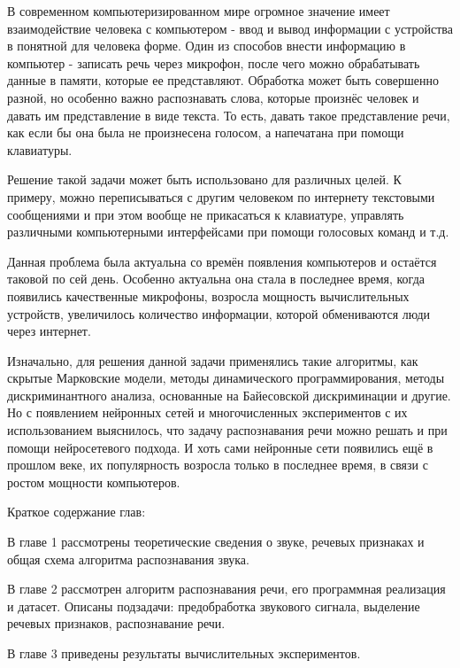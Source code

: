 В современном компьютеризированном мире огромное значение имеет взаимодействие человека с компьютером - ввод и вывод информации с устройства в понятной для человека форме. Один из способов внести информацию в компьютер - записать речь через микрофон, после чего можно обрабатывать данные в памяти, которые ее представляют. Обработка может быть совершенно разной, но особенно важно распознавать слова, которые произнёс человек и давать им представление в виде текста. То есть, давать такое представление речи, как если бы она была не произнесена голосом, а напечатана при помощи клавиатуры. 

Решение такой задачи может быть использовано для различных целей. К примеру, можно переписываться с другим человеком по интернету текстовыми сообщениями и при этом вообще не прикасаться к клавиатуре, управлять различными компьютерными интерфейсами при помощи голосовых команд и т.д.

Данная проблема была актуальна со времён появления компьютеров и остаётся таковой по сей день. Особенно актуальна она стала в последнее время, когда появились качественные микрофоны, возросла мощность вычислительных устройств, увеличилось количество информации, которой обмениваются люди через интернет.

Изначально, для решения данной задачи применялись такие алгоритмы, как скрытые Марковские модели, методы динамического программирования, методы дискриминантного анализа, основанные на Байесовской дискриминации и другие. Но с появлением нейронных сетей и многочисленных экспериментов с их использованием выяснилось, что задачу распознавания речи можно решать и при помощи нейросетевого подхода. И хоть сами нейронные сети появились ещё в прошлом веке, их популярность возросла только в последнее время, в связи с ростом мощности компьютеров.

Краткое содержание глав:

В главе 1 рассмотрены теоретические сведения о звуке, речевых признаках и общая схема алгоритма распознавания звука. 
 
В главе 2 рассмотрен алгоритм распознавания речи, его программная реализация и датасет. Описаны подзадачи: предобработка звукового сигнала, выделение речевых признаков, распознавание речи.

В главе 3 приведены результаты вычислительных экспериментов.